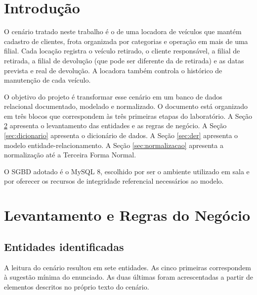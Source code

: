 \section{Introdu\c{c}\~ao}

O cen\'ario tratado neste trabalho \'e o de uma locadora de ve\'iculos que mant\'em cadastro de clientes, frota organizada por categorias e opera\c{c}\~ao em mais de uma filial. Cada loca\c{c}\~ao registra o ve\'iculo retirado, o cliente respons\'avel, a filial de retirada, a filial de devolu\c{c}\~ao (que pode ser diferente da de retirada) e as datas prevista e real de devolu\c{c}\~ao. A locadora tamb\'em controla o hist\'orico de manuten\c{c}\~ao de cada ve\'iculo.

O objetivo do projeto \'e transformar esse cen\'ario em um banco de dados relacional documentado, modelado e normalizado. O documento est\'a organizado em tr\^es blocos que correspondem \`as tr\^es primeiras etapas do laborat\'orio. A Se\c{c}\~ao \ref{sec:levantamento} apresenta o levantamento das entidades e as regras de neg\'ocio. A Se\c{c}\~ao \ref{sec:dicionario} apresenta o dicion\'ario de dados. A Se\c{c}\~ao \ref{sec:der} apresenta o modelo entidade-relacionamento. A Se\c{c}\~ao \ref{sec:normalizacao} apresenta a normaliza\c{c}\~ao at\'e a Terceira Forma Normal.

O SGBD adotado \'e o MySQL 8, escolhido por ser o ambiente utilizado em sala e por oferecer os recursos de integridade referencial necess\'arios ao modelo.

\section{Levantamento e Regras do Neg\'ocio}
\label{sec:levantamento}

\subsection{Entidades identificadas}

A leitura do cen\'ario resultou em sete entidades. As cinco primeiras correspondem \`a sugest\~ao m\'inima do enunciado. As duas \'ultimas foram acrescentadas a partir de elementos descritos no pr\'oprio texto do cen\'ario.

